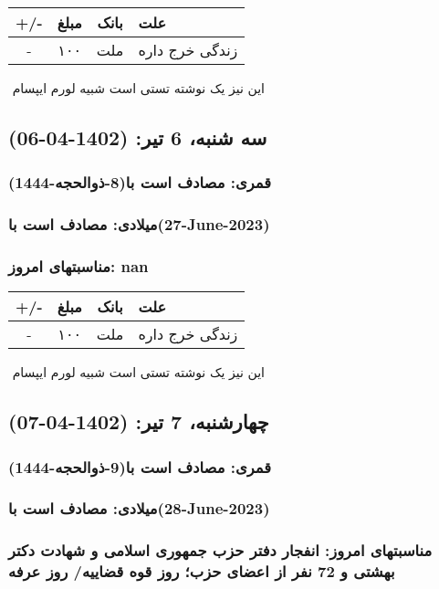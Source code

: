 \documentclass{article}
\newcommand{\rnote}[1]{\marginpar{\textcolor{color}{\StrSubstitute{\##1}{ }{\_}}}}
\newcommand{\myRow}[4]{
    #1 & #2 & #3 & #4 \\ \hline
}
\begin{document}
\begin{tabular}{ | c | c | c | p{5cm} |}
    \hline
    \myRow{ +/- }{مبلغ}{بانک}{علت}
    \myRow{-}{۱۰۰}{ملت}{زندگی خرج داره}
\end{tabular}
\newline
\newline

‌
\rnote{تست}
این نیز یک نوشته تستی است شبیه لورم ایپسام




\newpage
{}
\textcolor{color}{
\section{ سه شنبه، 6 تیر: (1402-04-06) }
\subsubsection*{قمری: مصادف است با(8-ذوالحجه-1444)} 
\subsubsection*{میلادی: مصادف است با(27-June-2023)}
\subsubsection*{مناسبتهای امروز: nan}
}


\begin{tabular}{ | c | c | c | p{5cm} |}
    \hline
    \myRow{ +/- }{مبلغ}{بانک}{علت}
    \myRow{-}{۱۰۰}{ملت}{زندگی خرج داره}
\end{tabular}
\newline
\newline

‌
\rnote{تست}
این نیز یک نوشته تستی است شبیه لورم ایپسام




\newpage
{}
\textcolor{color}{
\section{ چهارشنبه، 7 تیر: (1402-04-07) }
\subsubsection*{قمری: مصادف است با(9-ذوالحجه-1444)} 
\subsubsection*{میلادی: مصادف است با(28-June-2023)}
\subsubsection*{مناسبتهای امروز: انفجار دفتر حزب جمهوری اسلامی و شهادت دکتر بهشتی و 72 نفر از اعضای حزب؛ روز قوه قضاییه/  روز عرفه }
}
\end{document}
